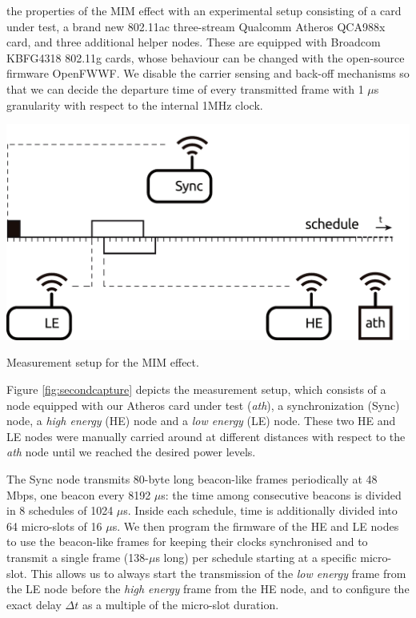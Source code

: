 \documentclass[twoside,nohyper]{tufte-book}
\begin{document}
 the properties of the MIM effect with an experimental setup consisting of a card under test, a brand new 802.11ac three-stream Qualcomm Atheros QCA988x card, and three additional helper nodes. These are equipped with Broadcom KBFG4318 802.11g cards, whose behaviour can be changed with the open-source firmware OpenFWWF\cite[0pt]{openfwwfweb}. We disable the carrier sensing and back-off mechanisms so that we can decide the departure time of every transmitted frame with 1 \(\mu\)s granularity with respect to the internal 1MHz clock.



\begin{marginfigure}

{\centering \includegraphics[width=1\linewidth]{img/05/testbed-francesco} 

}

\caption[Measurement setup for the MIM effect.]{Measurement setup for the MIM effect.}\label{fig:secondcapture}
\end{marginfigure}

Figure \ref{fig:secondcapture} depicts the measurement setup, which consists of a node equipped with our Atheros card under test (\emph{ath}), a synchronization (Sync) node, a \emph{high energy} (HE) node and a \emph{low energy} (LE) node. These two HE and LE nodes were manually carried around at different distances with respect to the \emph{ath} node until we reached the desired power levels.

The Sync node transmits 80-byte long beacon-like frames periodically at 48 Mbps, one beacon every 8192 \(\mu\)s: the time among consecutive beacons is divided in 8 schedules of 1024 \(\mu\)s. Inside each schedule, time is additionally divided into 64 micro-slots of 16 \(\mu\)s. We then program the firmware of the HE and LE nodes to use the beacon-like frames for keeping their clocks synchronised and to transmit a single frame (138-\(\mu\)s long) per schedule starting at a specific micro-slot. This allows us to always start the transmission of the \emph{low energy} frame from the LE node before the \emph{high energy} frame from the HE node, and to configure the exact delay \(\Delta t\) as a multiple of the micro-slot duration.
\end{document}
